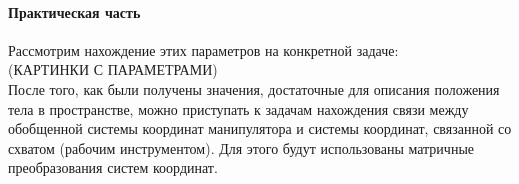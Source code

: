 \documentclass[12pt,a4paper,openany]{extarticle}
\begin{document}
 \paragraph*{Практическая часть\\}
 
\hspace*{\parindent}Рассмотрим нахождение этих параметров на конкретной задаче:\\
(КАРТИНКИ С ПАРАМЕТРАМИ)\\

\hspace*{\parindent}После того, как были получены значения, достаточные для описания положения тела в пространстве, можно приступать к задачам нахождения связи между обобщенной системы координат манипулятора и системы координат, связанной со схватом (рабочим инструментом). Для этого будут использованы матричные преобразования систем координат.\\
\end{document}
